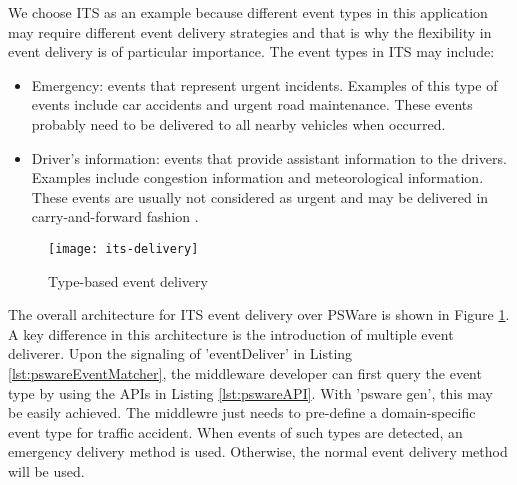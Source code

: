 We choose ITS as an example because different event types in this application may require different event delivery strategies and that is why the flexibility in event delivery is of particular importance. The event types in ITS may include:
\begin{itemize}
\item Emergency: events that represent urgent incidents. Examples of this type of events include car accidents and urgent road maintenance. These events probably need to be delivered to all nearby vehicles when occurred.
\item Driver's information: events that provide assistant information to the drivers. Examples include congestion information and meteorological information. These events are usually not considered as urgent and may be delivered in carry-and-forward fashion \cite{cartel}.
\end{itemize}

\begin{figure}
\centering
\texttt{[image: its-delivery]}
\caption{Type-based event delivery}
\label{fig:its-delivery}
\end{figure}

The overall architecture for ITS event delivery over PSWare is shown in Figure \ref{fig:its-delivery}. A key difference in this architecture is the introduction of multiple event deliverer. Upon the signaling of 'eventDeliver' in Listing \ref{lst:pswareEventMatcher}, the middleware developer can first query the event type by using the APIs in Listing \ref{lst:pswareAPI}. With 'psware gen', this may be easily achieved. The middlewre just needs to pre-define a domain-specific event type for traffic accident. When events of such types are detected, an emergency delivery method is used. Otherwise, the normal event delivery method will be used.
